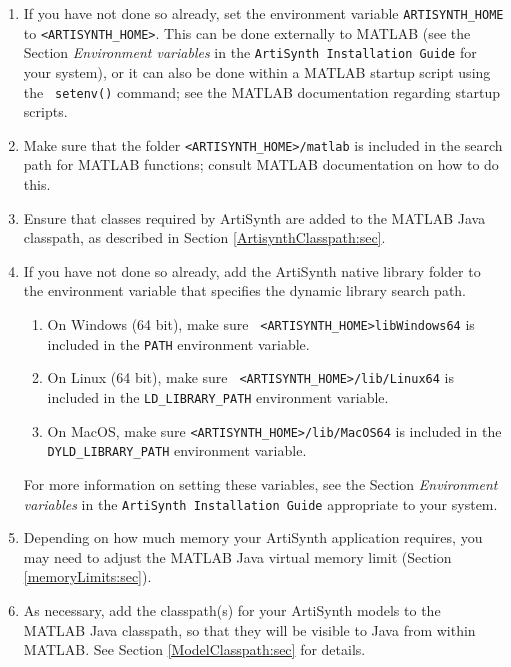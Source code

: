 \documentclass{article}
\begin{document}
\begin{enumerate}

\item If you have not done so already, set the environment variable
{\tt ARTISYNTH\_HOME} to {\tt <ARTISYNTH\_HOME>}. This can be done
externally to MATLAB (see the Section {\it Environment variables} in
the {\tt ArtiSynth Installation Guide} for your system), or
it can also be done within a MATLAB startup script using the {\tt
setenv()} command; see the MATLAB documentation regarding startup scripts.

\item Make sure that the folder {\tt <ARTISYNTH\_HOME>/matlab} is
included in the search path for MATLAB functions; consult MATLAB
documentation on how to do this.

\item Ensure that classes required by ArtiSynth are added
to the MATLAB Java classpath, as described in Section
\ref{ArtisynthClasspath:sec}.

\item If you have not done so already, add the ArtiSynth native
library folder to the environment variable that specifies the dynamic
library search path. 

\begin{enumerate}

\item On Windows (64 bit), make sure {\tt
<ARTISYNTH\_HOME>\BKS lib\BKS Windows64} is included in the {\tt PATH}
environment variable.

\item On Linux (64 bit), make sure {\tt
<ARTISYNTH\_HOME>/lib/Linux64} is included in the {\tt LD\_LIBRARY\_PATH}
environment variable.

\item On MacOS, make sure {\tt <ARTISYNTH\_HOME>/lib/MacOS64} is
included in the {\tt DYLD\_LIBRARY\_PATH} environment variable.

\end{enumerate}

For more information on setting these variables, see the Section {\it
Environment variables} in the {\tt ArtiSynth Installation Guide}
appropriate to your system.

\item Depending on how much memory your ArtiSynth application requires,
you may need to adjust the MATLAB Java virtual memory limit (Section
\ref{memoryLimits:sec}).

\item As necessary, add the classpath(s) for your ArtiSynth models to
the MATLAB Java classpath, so that they will be visible to Java from
within MATLAB. See Section \ref{ModelClasspath:sec} for details.

\end{enumerate}
\end{document}
